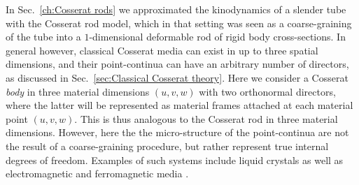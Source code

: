 In Sec.~\ref{ch:Cosserat rods} we approximated the kinodynamics of a slender tube with the Cosserat rod model, which in that setting was seen as a coarse-graining of the tube into a $1$-dimensional deformable rod of rigid body cross-sections. In general however, classical Cosserat media can exist in up to three spatial dimensions, and their point-continua can have an arbitrary number of directors, as discussed in Sec.~\ref{sec:Classical Cosserat theory}. Here we consider a Cosserat \textit{body} in three material dimensions $(u, v, w)$ with two orthonormal directors, where the latter will be represented as material frames attached at each material point $(u, v, w)$. This is thus analogous to the Cosserat rod in three material dimensions. However, here the the micro-structure of the point-continua are not the result of a coarse-graining procedure, but rather represent true internal degrees of freedom. Examples of such systems include liquid crystals \citep{epsteinContinuousDistributionsInhomogeneities2001, gorielyRodTheoryLiquid2022} as well as electromagnetic and ferromagnetic media \citep{ivanovaNewTheoryCosserat2022, pariaUnifiedTheoryMechanics1978, ivanovaModelingPhysicalFields}.

